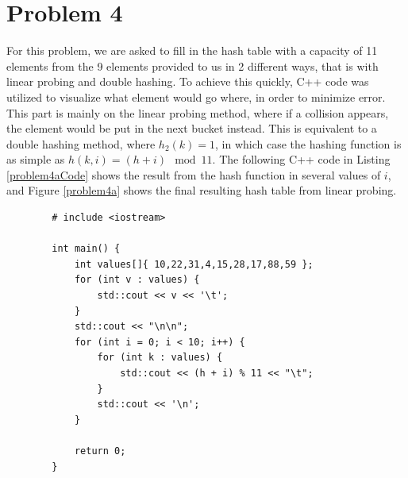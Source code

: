 \documentclass{report}
\begin{document}
\section*{Problem 4}
For this problem, we are asked to fill in the hash table with a capacity of 11 elements from the 9 elements provided to us in 2 different ways, that is with linear probing and double hashing. To achieve this quickly, C++ code was utilized to visualize what element would go where, in order to minimize error. This part is mainly on the linear probing method, where if a collision appears, the element would be put in the next bucket instead. This is equivalent to a double hashing method, where $h_2(k) = 1$, in which case the hashing function is as simple as $h(k, i) = (h + i) \mod 11$. The following C++ code in Listing \ref{problem4aCode} shows the result from the hash function in several values of $i$, and Figure \ref{problem4a} shows the final resulting hash table from linear probing.
\begin{listing}[h]
	\begin{verbatim}
		# include <iostream>
		
		int main() {
			int values[]{ 10,22,31,4,15,28,17,88,59 };
			for (int v : values) {
				std::cout << v << '\t';
			}
			std::cout << "\n\n";
			for (int i = 0; i < 10; i++) {
				for (int k : values) {
					std::cout << (h + i) % 11 << "\t";
				}
				std::cout << '\n';
			}
			
			return 0;
		}
	\end{verbatim}
	\caption{C++ code to print out the linear probed indices for various $i$.}
	\label{problem4aCode}
\end{listing}
\end{document}
